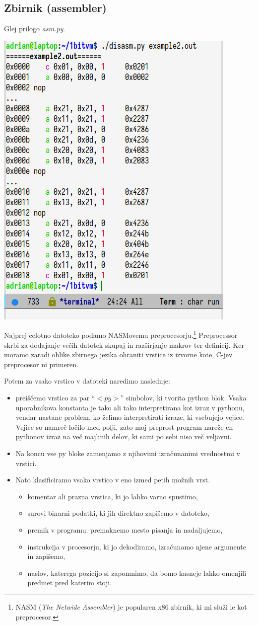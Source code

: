 \documentclass[12pt]{article}
\begin{document}
\subsection{Zbirnik (assembler)}
Glej prilogo \textit{asm.py}.

\begin{center}
  \includegraphics[width=.4\linewidth]{slike/razbirnik.png}
\end{center}

Najprej celotno datoteko podamo NASMovemu preprocesorju.\footnote{NASM (\textit{The Netwide Assembler}) je popularen x86 zbirnik, ki mi služi le kot preprocesor.}
Preprocessor skrbi za dodajanje večih datotek skupaj in razširjanje makrov ter definicij.
Ker moramo zaradi oblike zbirnega jezika ohraniti vrstice iz izvorne kote, C-jev preprocesor ni primeren.

Potem za vsako vrstico v datoteki naredimo naslednje:
\begin{itemize}
  \item preiščemo vrstico za par ``$<py>$'' simbolov, ki tvorita python blok.
  Vsaka uporabnikova konstanta je tako ali tako interpretirana kot izraz v pythonu, vendar nastane problem, ko želimo interpretirati izraze, ki vsebujejo vejice.
  Vejice so namreč ločilo med polji, zato moj preprost program nareže en pythonov izraz na več majhnih delov, ki sami po sebi niso več veljavni.
  \item Na koncu vse py bloke zamenjamo z njihovimi izračunanimi vrednostmi v vrstici.
  \item Nato klasificiramo vsako vrstico v eno izmed petih možnih vrst.
  \begin{itemize}
    \item komentar ali prazna vrstica, ki jo lahko varno spustimo,
    \item surovi binarni podatki, ki jih direktno zapišemo v datoteko,
    \item premik v programu: premaknemo mesto pisanja in nadaljujemo,
    \item instrukcija v procesorju, ki jo dekodiramo, izračunamo njene argumente in zapišemo,
    \item naslov, katerega pozicijo si zapomnimo, da bomo kasneje lahko omenjili predmet pred katerim stoji.
  \end{itemize}
\end{itemize}
\end{document}
